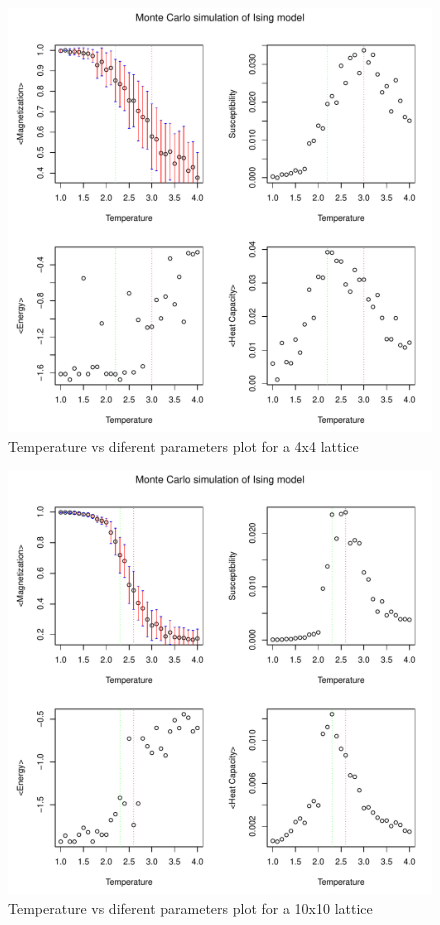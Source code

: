 \documentclass[]{article}
\begin{document}
\begin{figure}[H]
  \includegraphics[scale=0.8]{figures/fig_4}%
  \caption{\label{fig:epsart} Temperature vs diferent parameters plot for a 4x4 lattice}
\end{figure}

\begin{figure}[H]
  \centering
  \includegraphics[scale=0.8]{figures/fig_5}%
  \caption{\label{fig:epsart} Temperature vs diferent parameters plot for a 10x10 lattice}
\end{figure}
\end{document}
